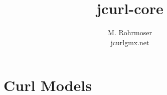 \documentclass[a4paper,11pt,twoside]{report}
\title{jcurl-core}
\author{M. Rohrmoser\\{\small jcurl\symbol{64}gmx.net}}
\begin{document}
\maketitle
\tableofcontents


\chapter{Curl Models}



\begin{appendix}
\end{appendix}



\end{document}
